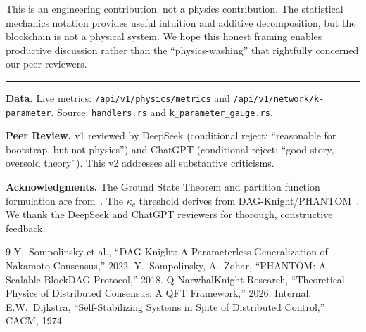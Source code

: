 \documentclass[11pt,a4paper,twocolumn]{article}
\begin{document}
This is an engineering contribution, not a physics contribution. The statistical mechanics notation provides useful intuition and additive decomposition, but the blockchain is not a physical system. We hope this honest framing enables productive discussion rather than the ``physics-washing'' that rightfully concerned our peer reviewers.

\vspace{0.5cm}
\hrule
\vspace{0.3cm}
{\small\textbf{Data.} Live metrics: \texttt{/api/v1/physics/metrics} and \texttt{/api/v1/network/k-parameter}. Source: \texttt{handlers.rs} and \texttt{k\_parameter\_gauge.rs}.}

\vspace{0.2cm}
{\small\textbf{Peer Review.} v1 reviewed by DeepSeek (conditional reject: ``reasonable for bootstrap, but not physics'') and ChatGPT (conditional reject: ``good story, oversold theory''). This v2 addresses all substantive criticisms.}

\vspace{0.2cm}
{\small\textbf{Acknowledgments.} The Ground State Theorem and partition function formulation are from~\cite{qnk-node-system}. The $\kappa_c$ threshold derives from DAG-Knight/PHANTOM~\cite{dagknight,phantom}. We thank the DeepSeek and ChatGPT reviewers for thorough, constructive feedback.}

\begin{thebibliography}{9}
\small
{} Y.~Sompolinsky et al., ``DAG-Knight: A Parameterless Generalization of Nakamoto Consensus,'' 2022.
 Y.~Sompolinsky, A.~Zohar, ``PHANTOM: A Scalable BlockDAG Protocol,'' 2018.
 Q-NarwhalKnight Research, ``Theoretical Physics of Distributed Consensus: A QFT Framework,'' 2026. Internal.
 E.W.~Dijkstra, ``Self-Stabilizing Systems in Spite of Distributed Control,'' CACM, 1974.
\end{thebibliography}
\end{document}
